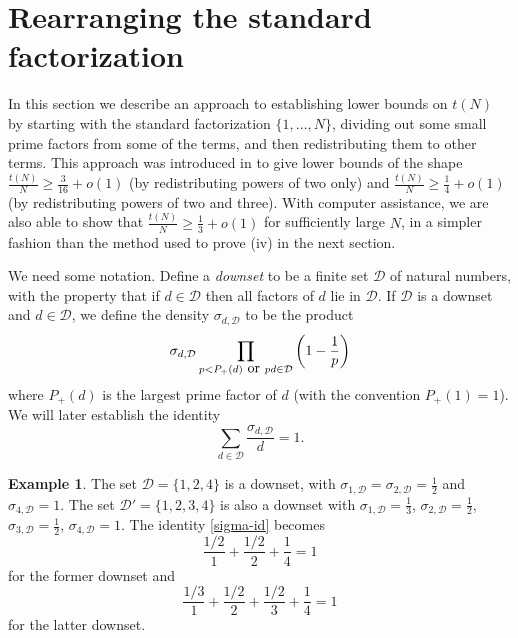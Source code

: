 \documentclass[12pt,a4paper,reqno]{amsart}
\numberwithin{equation}{section}
\theoremstyle{plain}
\theoremstyle{definition}
\newtheorem{example}[theorem]{Example}
\begin{document}
\section{Rearranging the standard factorization}\label{rearrange-sec}

In this section we describe an approach to establishing lower bounds on $t(N)$ by starting with the standard factorization $\{1,\dots,N\}$, dividing out some small prime factors from some of the terms, and then redistributing them to other terms.  This approach was introduced in \cite{guy} to give lower bounds of the shape $\frac{t(N)}{N} \geq \frac{3}{16} + o(1)$ (by redistributing powers of two only) and $\frac{t(N)}{N} \geq \frac{1}{4} + o(1)$ (by redistributing powers of two and three).  With computer assistance, we are also able to show that $\frac{t(N)}{N} \geq \frac{1}{3}+o(1)$ for sufficiently large $N$, in a simpler fashion than the method used to prove (iv) in the next section.

We need some notation.  Define a \emph{downset} to be a finite set ${\mathcal D}$ of natural numbers, with the property that if $d \in {\mathcal D}$ then all factors of $d$ lie in ${\mathcal D}$.  If ${\mathcal D}$ is a downset and $d \in {\mathcal D}$, we define the density $\sigma_{d,{\mathcal D}}$ to be the product
$$ \sigma_{d,{\mathcal D}}\prod_{p < P_+(d) \hbox{ or } pd \in {\mathcal D}} \left(1-\frac{1}{p}\right)$$
where $P_+(d)$ is the largest prime factor of $d$ (with the convention $P_+(1)=1$). We will later establish the identity
\begin{equation}\label{sigma-id}
  \sum_{d \in {\mathcal D}} \frac{\sigma_{d,{\mathcal D}}}{d} = 1.
\end{equation}

\begin{example}  The set ${\mathcal D} = \{1,2,4\}$ is a downset, with $\sigma_{1,{\mathcal D}} = \sigma_{2,{\mathcal D}} = \frac{1}{2}$ and $\sigma_{4,\mathcal D} = 1$.  The set ${\mathcal D}' = \{1,2,3,4\}$ is also a downset with $\sigma_{1,{\mathcal D}} = \frac{1}{3}$, $\sigma_{2,{\mathcal D}} = \frac{1}{2}$, $\sigma_{3,{\mathcal D}} = \frac{1}{2}$, $\sigma_{4,{\mathcal D}} = 1$.  The identity \eqref{sigma-id} becomes
$$ \frac{1/2}{1} + \frac{1/2}{2} + \frac{1}{4} = 1$$
for the former downset and
$$ \frac{1/3}{1} + \frac{1/2}{2} + \frac{1/2}{3} + \frac{1}{4} = 1$$
for the latter downset.
\end{example}
\end{document}
